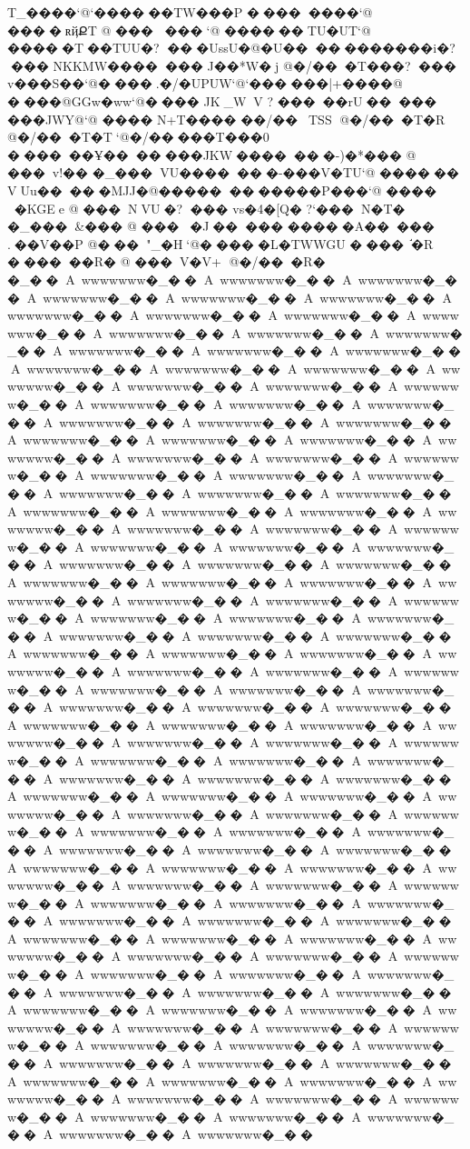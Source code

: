 {{{{{{{{{{{{{{{{{{{{{{{{{{{{{{{{{{{{{{{{{{{{{{{{{{{{{{{{{{{{{{{{{T_����`@`������TW���P ��������    `@ ����ʀҋՔT @ ���
���   `@ ������TU�UT`@ �����T��TUU�? ���UssU�@�U���������� �i�? ���	NKKMW� ������	J��*W�j @�/���T��    �? ���	v���S�� `@����.�/�UPUW`@`������|+����@ ����@  GGw�ww`@����	JK_WV ? �����rU   �����	���JWY @`@ ����	N+T���� ��/��TSS    @�/���T�R    @�/���T�T   `@�/���� �T���0 ������Ұ    �������JKW�������-)�*� �� @ ���v!��     �_���VU��    �����-���V�TU`@ ������
VUu�����MJJ�@������������P���`@ ����	�KGEe @ ���NVU   �? ���	vs�4�[Q� ?`���N�T�     �_���&���     @ ��� �J   �����	�����A �����	.��V��P @���"_�H   `@�����L�TWWGU ����֬�R    ������R�     @ ���V�V+    @�/���R�
    �_��A~wwwwwww�_��A~wwwwwww�_��A~wwwwwww�_��A~wwwwwww�_��A~wwwwwww�_��A~wwwwwww�_��A~wwwwwww�_��A~wwwwwww�_��A~wwwwwww�_��A~wwwwwww�_��A~wwwwwww�_��A~wwwwwww�_��A~wwwwwww�_��A~wwwwwww�_��A~wwwwwww�_��A~wwwwwww�_��A~wwwwwww�_��A~wwwwwww�_��A~wwwwwww�_��A~wwwwwww�_��A~wwwwwww�_��A~wwwwwww�_��A~wwwwwww�_��A~wwwwwww�_��A~wwwwwww�_��A~wwwwwww�_��A~wwwwwww�_��A~wwwwwww�_��A~wwwwwww�_��A~wwwwwww�_��A~wwwwwww�_��A~wwwwwww�_��A~wwwwwww�_��A~wwwwwww�_��A~wwwwwww�_��A~wwwwwww�_��A~wwwwwww�_��A~wwwwwww�_��A~wwwwwww�_��A~wwwwwww�_��A~wwwwwww�_��A~wwwwwww�_��A~wwwwwww�_��A~wwwwwww�_��A~wwwwwww�_��A~wwwwwww�_��A~wwwwwww�_��A~wwwwwww�_��A~wwwwwww�_��A~wwwwwww�_��A~wwwwwww�_��A~wwwwwww�_��A~wwwwwww�_��A~wwwwwww�_��A~wwwwwww�_��A~wwwwwww�_��A~wwwwwww�_��A~wwwwwww�_��A~wwwwwww�_��A~wwwwwww�_��A~wwwwwww�_��A~wwwwwww�_��A~wwwwwww�_��A~wwwwwww�_��A~wwwwwww�_��A~wwwwwww�_��A~wwwwwww�_��A~wwwwwww�_��A~wwwwwww�_��A~wwwwwww�_��A~wwwwwww�_��A~wwwwwww�_��A~wwwwwww�_��A~wwwwwww�_��A~wwwwwww�_��A~wwwwwww�_��A~wwwwwww�_��A~wwwwwww�_��A~wwwwwww�_��A~wwwwwww�_��A~wwwwwww�_��A~wwwwwww�_��A~wwwwwww�_��A~wwwwwww�_��A~wwwwwww�_��A~wwwwwww�_��A~wwwwwww�_��A~wwwwwww�_��A~wwwwwww�_��A~wwwwwww�_��A~wwwwwww�_��A~wwwwwww�_��A~wwwwwww�_��A~wwwwwww�_��A~wwwwwww�_��A~wwwwwww�_��A~wwwwwww�_��A~wwwwwww�_��A~wwwwwww�_��A~wwwwwww�_��A~wwwwwww�_��A~wwwwwww�_��A~wwwwwww�_��A~wwwwwww�_��A~wwwwwww�_��A~wwwwwww�_��A~wwwwwww�_��A~wwwwwww�_��A~wwwwwww�_��A~wwwwwww�_��A~wwwwwww�_��A~wwwwwww�_��A~wwwwwww�_��A~wwwwwww�_��A~wwwwwww�_��A~wwwwwww�_��A~wwwwwww�_��A~wwwwwww�_��A~wwwwwww�_��A~wwwwwww�_��A~wwwwwww�_��A~wwwwwww�_��A~wwwwwww�_��A~wwwwwww�_��A~wwwwwww�_��A~wwwwwww�_��A~wwwwwww�_��A~wwwwwww�_��A~wwwwwww�_��A~wwwwwww�_��A~wwwwwww�_��A~wwwwwww�_��A~wwwwwww�_��A~wwwwwww�_��A~wwwwwww�_��A~wwwwwww�_��A~wwwwwww�_��A~wwwwwww�_��A~wwwwwww�_��A~wwwwwww�_��A~wwwwwww�_��A~wwwwwww�_��A~wwwwwww�_��A~wwwwwww�_��A~wwwwwww�_��A~wwwwwww�_��A~wwwwwww�_��A~wwwwwww�_��A~wwwwwww�_��A~wwwwwww�_��A~wwwwwww�_��A~wwwwwww�_��A~wwwwwww�_��A~wwwwwww�_��A~wwwwwww�_��A~wwwwwww�_��A~wwwwwww�_��A~wwwwwww�_��}}}}}}}}}}}}}}}}}}}}}}}}}}}}}}}}}}}}}}}}}}}}}}}}}}}}}}}}}}}}}}}}}
